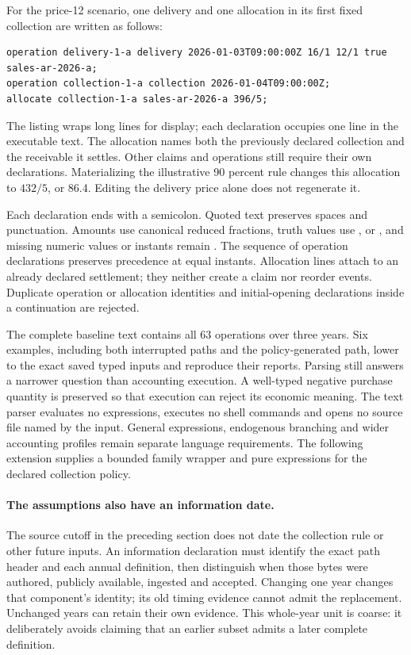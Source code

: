 For the price-12 scenario, one delivery and one allocation in its first fixed
collection are written as follows:
\begin{lstlisting}
operation delivery-1-a delivery 2026-01-03T09:00:00Z 16/1 12/1 true sales-ar-2026-a;
operation collection-1-a collection 2026-01-04T09:00:00Z;
allocate collection-1-a sales-ar-2026-a 396/5;
\end{lstlisting}
The listing wraps long lines for display; each declaration occupies one line
in the executable text. The allocation names both the
previously declared collection and the receivable it settles. Other claims and
operations still require their own declarations. Materializing the illustrative
90 percent rule changes this allocation to \(432/5\), or 86.4. Editing the
delivery price alone does not regenerate it.

Each declaration ends with a semicolon. Quoted text preserves spaces and
punctuation. Amounts use canonical reduced fractions, truth values use
,  or , and missing numeric values or
instants remain . The sequence of operation declarations preserves
precedence at equal instants. Allocation lines attach to an already declared
settlement; they neither create a claim nor reorder events. Duplicate operation
or allocation identities and initial-opening declarations inside a continuation
are rejected.

The complete baseline text contains all 63 operations over three years.
Six examples, including both interrupted paths and the policy-generated path,
lower to the exact saved typed inputs and reproduce their reports. Parsing
still answers a narrower question than accounting execution. A well-typed
negative purchase quantity is preserved so that execution can reject its
economic meaning. The text parser evaluates no expressions, executes no shell
commands and opens no source file named by the input. General expressions,
endogenous branching and wider accounting profiles remain separate language
requirements. The following extension supplies a bounded family wrapper and
pure expressions for the declared collection policy.

\paragraph{The assumptions also have an information date.}
The source cutoff in the preceding section does not date the collection rule
or other future inputs. An information declaration must identify the exact
path header and each annual definition, then distinguish when those bytes were
authored, publicly available, ingested and accepted. Changing one year changes
that component's identity; its old timing evidence cannot admit the replacement.
Unchanged years can retain their own evidence. This whole-year unit is coarse:
it deliberately avoids claiming that an earlier subset admits a later complete
definition.

